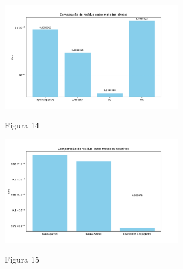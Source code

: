 \documentclass{article}
\begin{document}
    \begin{figure}[ht]
        \centering
        \includegraphics[width=0.7\textwidth, trim={5px 10px 15px 25px},clip]{../figs/fig14.pdf}
        
        Figura 14
    \end{figure}

    \vspace{2cm}

    \begin{figure}[ht]
        \centering
        \includegraphics[width=0.7\textwidth, trim={5px 10px 15px 25px},clip]{../figs/fig15.pdf}
        
        Figura 15
    \end{figure}
\end{document}
